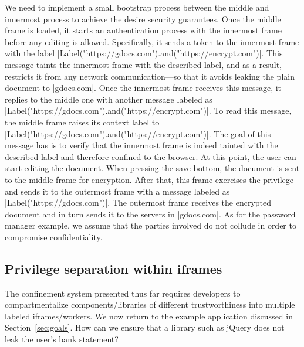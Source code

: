We need to implement a small bootstrap process between the middle and innermost
process to achieve the desire security guarantees. Once the middle frame is
loaded, it starts an authentication process with the innermost frame before any
editing is allowed. Specifically, it sends a token to the innermost
frame with the label \js|Label("https://gdocs.com").and("https://encrypt.com")|.
This message taints the innermost frame with the described label, and as a
result, restricts it from any network communication---so that it avoids leaking
the plain document to \js|gdocs.com|. Once the innermost frame receives this
message, it replies to the middle one with another message labeled as
\js|Label("https://gdocs.com").and("https://encrypt.com")|. To read this
message, the middle frame raises its context label to
\js|Label("https://gdocs.com").and("https://encrypt.com")|. The goal of this
message has is to verify that the innermost frame is indeed tainted with the
described label and therefore confined to the browser. At this point, the user
can start editing the document.  When pressing the save bottom, the document is
sent to the middle frame for encryption. After that, this frame exercises the
privilege  and sends it to the outermost frame with a message
labeled as \js|Label("https://gdocs.com")|. The outermost frame receives the
encrypted document and in turn sends it to the servers in \js|gdocs.com|. As for
the password manager example, we assume that the parties involved do not collude
in order to compromise confidentiality. 




\subsection{Privilege separation within iframes}
\label{sec:system:script}

The confinement system presented thus far requires developers to
compartmentalize components/libraries of different trustworthiness into
multiple labeled iframes/workers.
%
%
We now return to the  example application discussed in
Section~\ref{sec:goals}. How can we ensure that a library such as
jQuery does not leak the user's bank statement?

